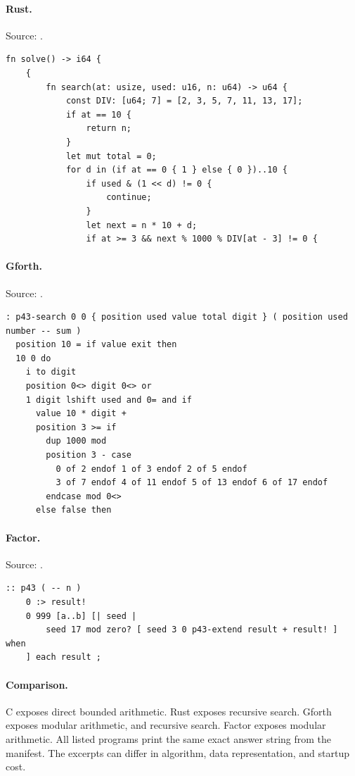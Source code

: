 \paragraph{Rust.} Source: .
\begin{lstlisting}
fn solve() -> i64 {
    {
        fn search(at: usize, used: u16, n: u64) -> u64 {
            const DIV: [u64; 7] = [2, 3, 5, 7, 11, 13, 17];
            if at == 10 {
                return n;
            }
            let mut total = 0;
            for d in (if at == 0 { 1 } else { 0 })..10 {
                if used & (1 << d) != 0 {
                    continue;
                }
                let next = n * 10 + d;
                if at >= 3 && next % 1000 % DIV[at - 3] != 0 {
\end{lstlisting}

\paragraph{Gforth.} Source: .
\begin{lstlisting}
: p43-search 0 0 { position used value total digit } ( position used number -- sum )
  position 10 = if value exit then
  10 0 do
    i to digit
    position 0<> digit 0<> or
    1 digit lshift used and 0= and if
      value 10 * digit +
      position 3 >= if
        dup 1000 mod
        position 3 - case
          0 of 2 endof 1 of 3 endof 2 of 5 endof
          3 of 7 endof 4 of 11 endof 5 of 13 endof 6 of 17 endof
        endcase mod 0<>
      else false then
\end{lstlisting}

\paragraph{Factor.} Source: .
\begin{lstlisting}
:: p43 ( -- n )
    0 :> result!
    0 999 [a..b] [| seed |
        seed 17 mod zero? [ seed 3 0 p43-extend result + result! ] when
    ] each result ;
\end{lstlisting}

\paragraph{Comparison.}
C exposes direct bounded arithmetic. Rust exposes recursive search. Gforth exposes modular arithmetic, and recursive search. Factor exposes modular arithmetic.
All listed programs print the same exact answer string from the manifest. The excerpts can differ in algorithm, data representation, and startup cost.


